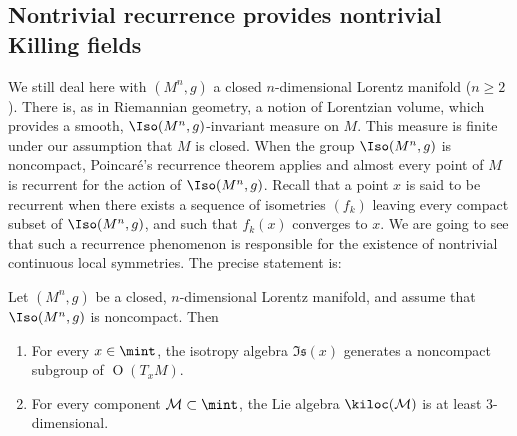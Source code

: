 \subsection{Nontrivial recurrence provides nontrivial Killing fields}\label{sec.recurrence}
We still deal here with $(M^n,g)$ a closed $n$-dimensional Lorentz manifold ($n \geq 2$). There is, as in Riemannian geometry, a notion of Lorentzian volume, which provides a smooth, $\Iso(M^n,g)$-invariant measure on $M$. This measure is finite under our assumption that $M$ is closed. When the group $\Iso(M^n,g)$ is noncompact, Poincaré's recurrence theorem applies and almost every point of $M$ is recurrent for the action of $\Iso(M^n,g)$. Recall that a point $x$ is said to be recurrent when there exists a sequence of isometries $(f_k)$ leaving every compact subset of $\Iso(M^n,g)$, and such that $f_k(x)$ converges to $x$. We are going to see that such a recurrence phenomenon is responsible for the existence of nontrivial continuous local symmetries. The precise statement is:

\begin{prop}\label{prop.dimension}
Let $(M^n,g)$ be a closed, $n$-dimensional Lorentz manifold, and assume that $\Iso(M^n,g)$ is noncompact. Then
\begin{enumerate}
\item \label{list3.5.1}For every $x \in \mint$, the isotropy algebra $\mathfrak{Is}(x)$ generates a noncompact subgroup of ${\operatorname O}(T_xM)$.
\item \label{list3.5.2}For every component ${\mathcal M} \subset \mint$, the Lie algebra $\kiloc({\mathcal M})$ is at least $3$-dimensional.
\end{enumerate}
\end{prop}


